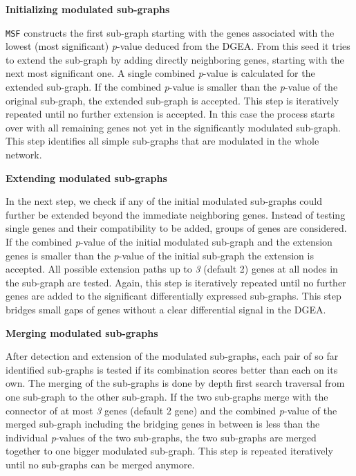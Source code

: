 \documentclass[10pt,a4paper,twocolumn]{article}
\begin{document}
	
	\textbf{Initializing modulated sub-graphs}
	
	\texttt{MSF} constructs the first sub-graph starting with the genes
	associated with the lowest (most significant) \textit{p}-value deduced from
	the DGEA. From this seed it tries to extend the sub-graph by adding directly
	neighboring genes, starting with the next most significant one. A single
	combined \textit{p}-value is calculated for the extended sub-graph.
	If the combined \textit{p}-value is smaller than the \textit{p}-value of
	the original sub-graph,
	the extended sub-graph is accepted. This step is
	iteratively repeated until no further extension is accepted. In this case
	the process starts over with all remaining genes not yet in the significantly
	modulated sub-graph. This step identifies all simple sub-graphs that
	are modulated in the whole network.\newline
	
	\textbf{Extending modulated sub-graphs}
	
	In the next step, we check if any of the initial modulated
        sub-graphs could further be extended beyond the immediate
          neighboring genes. Instead of testing single genes and
          their compatibility to be added, groups of genes are
          considered. If the combined \textit{p}-value of the
        initial modulated sub-graph and the extension genes is smaller
        than the \textit{p}-value of the initial sub-graph the
        extension is accepted. All possible extension paths up to
        \emph{3} (default 2) genes at all nodes in the sub-graph are
        tested. Again, this step is iteratively repeated until no
        further genes are added to the significant differentially
        expressed sub-graphs. This step bridges small gaps of genes
        without a clear differential signal in the DGEA.\newline
	
	\textbf{Merging modulated sub-graphs}

        After detection and extension of the modulated sub-graphs,
          each pair of so far identified sub-graphs is tested if its
          combination scores better than each on its own. The merging of
        the sub-graphs is done by depth first search traversal from
        one sub-graph to the other sub-graph. If the two sub-graphs
        merge with the connector of at most \emph{3} genes (default 2
        gene) and the combined \textit{p}-value of the merged
        sub-graph including the bridging genes in between is less than
        the individual \textit{p}-values of the two sub-graphs, the
        two sub-graphs are merged together to one bigger
        modulated sub-graph. This step is repeated iteratively until
        no sub-graphs can be merged
          anymore.\newline
	
\end{document}
